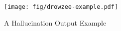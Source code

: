



\begin{figure}[t]
\centering
\vspace{3mm}
\hspace{-3mm}
\texttt{[image: fig/drowzee-example.pdf]}
\\[0.5em]
\caption{A Hallucination Output Example}
\label{fig:example1}
\vspace{-4mm}
\end{figure}

